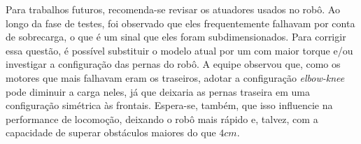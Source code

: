 \documentclass[../main.tex]{subfiles}
\begin{document}
  Para trabalhos futuros, recomenda-se revisar os atuadores usados no robô. Ao longo da fase de testes, foi observado que eles frequentemente falhavam por conta de sobrecarga, o que é um sinal que eles foram subdimensionados. Para corrigir essa questão, é possível substituir o modelo atual por um com maior torque e/ou investigar a configuração das pernas do robô. A equipe observou que, como os motores que mais falhavam eram os traseiros, adotar a configuração \textit{elbow-knee} pode diminuir a carga neles, já que deixaria as pernas traseira em uma configuração simétrica às frontais. Espera-se, também, que isso influencie na performance de locomoção, deixando o robô mais rápido e, talvez, com a capacidade de superar obstáculos maiores do que $4cm$.  
\end{document}
